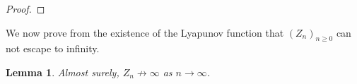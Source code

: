 \documentclass[a4paper, 11pt]{article}
\theoremstyle{plain}
\newtheorem{Lemma}[Theorem]{Lemma}
\theoremstyle{definition}
\newcommand{\E}{\mathbb{E}}
\renewcommand{\P}{\mathbb{P}}
\numberwithin{equation}{section}
\begin{document}
\begin{proof}
    
\end{proof}


We now prove from the existence of the Lyapunov function that $(Z_n)_{n\geq 0}$ can not escape to infinity.


\begin{Lemma}
    \label{lemma_notescape}
    Almost surely, $Z_n\not\to\infty$ as $n\to\infty$.
\end{Lemma}
\end{document}
